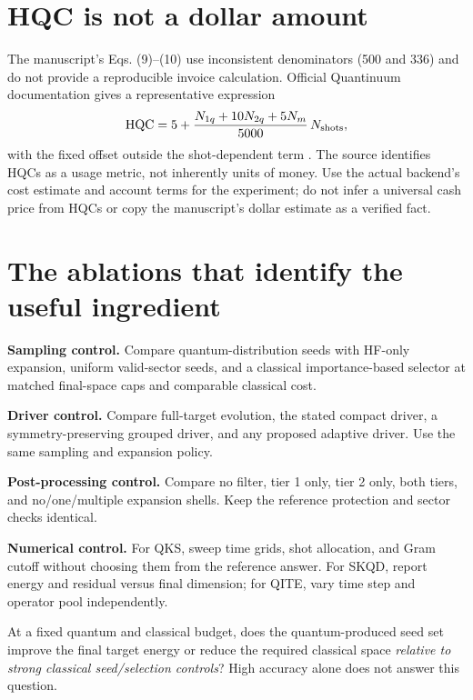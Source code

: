 \documentclass[11pt,a4paper,oneside]{report}
\begin{document}
\section{HQC is not a dollar amount}
The manuscript's Eqs. (9)--(10) use inconsistent denominators (500 and 336) and do not provide a reproducible invoice calculation. Official Quantinuum documentation gives a representative expression
\begin{equation}
\mathrm{HQC}=5+\frac{N_{1q}+10N_{2q}+5N_m}{5000}\,N_{\rm shots},
\end{equation}
with the fixed offset outside the shot-dependent term \cite{hqc}. The source identifies HQCs as a usage metric, not inherently units of money. Use the actual backend's cost estimate and account terms for the experiment; do not infer a universal cash price from HQCs or copy the manuscript's dollar estimate as a verified fact.

\section{The ablations that identify the useful ingredient}
\textbf{Sampling control.} Compare quantum-distribution seeds with HF-only expansion, uniform valid-sector seeds, and a classical importance-based selector at matched final-space caps and comparable classical cost.

\textbf{Driver control.} Compare full-target evolution, the stated compact driver, a symmetry-preserving grouped driver, and any proposed adaptive driver. Use the same sampling and expansion policy.

\textbf{Post-processing control.} Compare no filter, tier 1 only, tier 2 only, both tiers, and no/one/multiple expansion shells. Keep the reference protection and sector checks identical.

\textbf{Numerical control.} For QKS, sweep time grids, shot allocation, and Gram cutoff without choosing them from the reference answer. For SKQD, report energy and residual versus final dimension; for QITE, vary time step and operator pool independently.

\begin{idea}
At a fixed quantum and classical budget, does the quantum-produced seed set improve the final target energy or reduce the required classical space \emph{relative to strong classical seed/selection controls}? High accuracy alone does not answer this question.
\end{idea}
\end{document}
